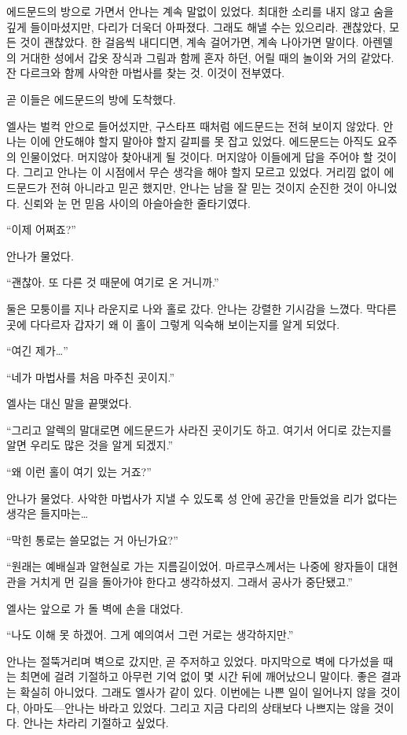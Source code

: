 에드문드의 방으로 가면서 안나는 계속 말없이 있었다. 최대한 소리를 내지 않고 숨을 깊게 들이마셨지만, 다리가 더욱더 아파졌다. 그래도 해낼 수는 있으리라. 괜찮았다, 모든 것이 괜찮았다. 한 걸음씩 내디디면, 계속 걸어가면, 계속 나아가면 말이다. 아렌델의 거대한 성에서 갑옷 장식과 그림과 함께 혼자 하던, 어릴 때의 놀이와 거의 같았다. 잔 다르크와 함께 사악한 마법사를 찾는 것. 이것이 전부였다.

곧 이들은 에드문드의 방에 도착했다.

엘사는 벌컥 안으로 들어섰지만, 구스타프 때처럼 에드문드는 전혀 보이지 않았다. 안나는 이에 안도해야 할지 말아야 할지 갈피를 못 잡고 있었다. 에드문드는 아직도 요주의 인물이었다. 머지않아 찾아내게 될 것이다. 머지않아 이들에게 답을 주어야 할 것이다. 그리고 안나는 이 시점에서 무슨 생각을 해야 할지 모르고 있었다. 거리낌 없이 에드문드가 전혀 아니라고 믿곤 했지만, 안나는 남을 잘 믿는 것이지 순진한 것이 아니었다. 신뢰와 눈 먼 믿음 사이의 아슬아슬한 줄타기였다.

``이제 어쩌죠?''

안나가 물었다.

``괜찮아. 또 다른 것 때문에 여기로 온 거니까.''

둘은 모퉁이를 지나 라운지로 나와 홀로 갔다. 안나는 강렬한 기시감을 느꼈다. 막다른 곳에 다다르자 갑자기 왜 이 홀이 그렇게 익숙해 보이는지를 알게 되었다.

``여긴 제가\ldots''

``네가 마법사를 처음 마주친 곳이지.''

엘사는 대신 말을 끝맺었다.

``그리고 알렉의 말대로면 에드문드가 사라진 곳이기도 하고. 여기서 어디로 갔는지를 알면 우리도 많은 것을 알게 되겠지.''

``왜 이런 홀이 여기 있는 거죠?''

안나가 물었다. 사악한 마법사가 지낼 수 있도록 성 안에 공간을 만들었을 리가 없다는 생각은 들지마는\ldots

``막힌 통로는 쓸모없는 거 아닌가요?''

``원래는 예배실과 알현실로 가는 지름길이었어. 마르쿠스께서는 나중에 왕자들이 대현관을 거치게 먼 길을 돌아가야 한다고 생각하셨지. 그래서 공사가 중단됐고.''

엘사는 앞으로 가 돌 벽에 손을 대었다.

``나도 이해 못 하겠어. 그게 예의여서 그런 거로는 생각하지만.''

안나는 절뚝거리며 벽으로 갔지만, 곧 주저하고 있었다. 마지막으로 벽에 다가섰을 때는 최면에 걸려 기절하고 아무런 기억 없이 몇 시간 뒤에 깨어났으니 말이다. 좋은 결과는 확실히 아니었다. 그래도 엘사가 같이 있다. 이번에는 나쁜 일이 일어나지 않을 것이다, 아마도—안나는 바라고 있었다. 그리고 지금 다리의 상태보다 나쁘지는 않을 것이다. 안나는 차라리 기절하고 싶었다.

